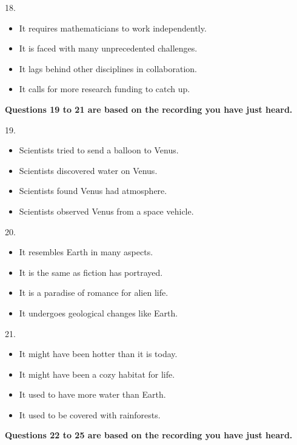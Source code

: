 \documentclass[UTF8,11pt]{ctexart}
\begin{document}
18.


\begin{itemize}[leftmargin=2em,itemsep=.2em,topsep=.4em]\item[A.] It requires mathematicians to work independently.
\item[B.] It is faced with many unprecedented challenges.
\item[C.] It lags behind other disciplines in collaboration.
\item[D.] It calls for more research funding to catch up.
\end{itemize}

\textbf{Questions 19 to 21 are based on the recording you have just heard.}


19.


\begin{itemize}[leftmargin=2em,itemsep=.2em,topsep=.4em]\item[A.] Scientists tried to send a balloon to Venus.
\item[B.] Scientists discovered water on Venus.
\item[C.] Scientists found Venus had atmosphere.
\item[D.] Scientists observed Venus from a space vehicle.
\end{itemize}

20.


\begin{itemize}[leftmargin=2em,itemsep=.2em,topsep=.4em]\item[A.] It resembles Earth in many aspects.
\item[B.] It is the same as fiction has portrayed.
\item[C.] It is a paradise of romance for alien life.
\item[D.] It undergoes geological changes like Earth.
\end{itemize}

21.


\begin{itemize}[leftmargin=2em,itemsep=.2em,topsep=.4em]\item[A.] It might have been hotter than it is today.
\item[B.] It might have been a cozy habitat for life.
\item[C.] It used to have more water than Earth.
\item[D.] It used to be covered with rainforests.
\end{itemize}

\textbf{Questions 22 to 25 are based on the recording you have just heard.}
\end{document}
